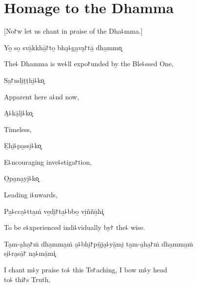 \clearpage

\chapter{Homage to the Dhamma}

\begin{leader}
\end{leader}

\begin{english}
  [No꜓w let us chant in praise of the Dha꜕mma.]
\end{english}

Yo̱ so̱ svā̱kkhā̱꜓to̱ bha̮꜕ga̮va̮꜓tā̱ dha̱mmo͓

\begin{english}
  The꜕ Dhamma is we꜕ll expo꜓unded by the Ble꜕ssed One,
\end{english}

Sa̱꜓ndi̱ṭṭhi̮꜕ko͓

\begin{english}
  Apparent here a꜕nd now,
\end{english}

A̮꜕kā̱li̮꜕ko͓

\begin{english}
  Timeless,
\end{english}

E̱hi̮꜕pa̱ssi̮꜕ko͓

\begin{english}
  E꜕ncouraging inve꜕stiga꜓tion,
\end{english}

O̱pa̮na̮yi̮꜕ko͓

\begin{english}
  Leading i꜕nwards,
\end{english}

Pa̱꜕cca̱꜕tta̱ṁ ve̱di̮꜓ta̱꜕bbo̱ vi̱ññū̱hi͓

\begin{english}
  To be e꜕xperienced indi꜕vidually by꜓ the꜕ wise.
\end{english}

Ta̮m-a̮ha̱꜓ṁ dha̱mma̱ṁ a̮꜕bhi̮꜓pū̱ja̮꜕yā̱mi̮ ta̮m-a̮ha̱꜓ṁ dha̱mma̱ṁ \\si̮꜕ra̮sā̱꜓ na̮꜕mā̱mi͓

\begin{english}
  I chant m꜕y praise to꜕ this Te꜓aching, I bow m꜕y head\\ to꜕ thi꜓s Truth.
\end{english}

